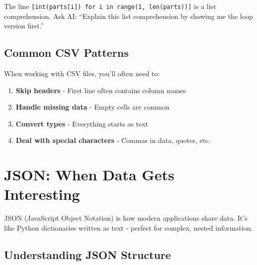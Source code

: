 \documentclass[
  letterpaper,
  DIV=11,
  numbers=noendperiod,
  oneside]{scrreprt}
\providecommand{\tightlist}{%
  \setlength{\itemsep}{0pt}\setlength{\parskip}{0pt}}\usepackage{longtable,booktabs,array}
\begin{document}
\begin{tcolorbox}[enhanced jigsaw, opacityback=0, colback=white, colframe=quarto-callout-warning-color-frame, breakable, titlerule=0mm, coltitle=black, rightrule=.15mm, colbacktitle=quarto-callout-warning-color!10!white, left=2mm, bottomtitle=1mm, bottomrule=.15mm, title=\textcolor{quarto-callout-warning-color}{\faExclamationTriangle}\hspace{0.5em}{Expression Explorer: List Comprehension}, opacitybacktitle=0.6, toptitle=1mm, leftrule=.75mm, arc=.35mm, toprule=.15mm]

The line
\texttt{{[}int(parts{[}i{]})\ for\ i\ in\ range(1,\ len(parts)){]}} is a
list comprehension. Ask AI: ``Explain this list comprehension by showing
me the loop version first.''

\end{tcolorbox}

\subsection{Common CSV Patterns}\label{common-csv-patterns}

When working with CSV files, you'll often need to:

\begin{enumerate}
\def\labelenumi{\arabic{enumi}.}
\tightlist
\item
  \textbf{Skip headers} - First line often contains column names
\item
  \textbf{Handle missing data} - Empty cells are common
\item
  \textbf{Convert types} - Everything starts as text
\item
  \textbf{Deal with special characters} - Commas in data, quotes, etc.
\end{enumerate}

\section{JSON: When Data Gets
Interesting}\label{json-when-data-gets-interesting}

JSON (JavaScript Object Notation) is how modern applications share data.
It's like Python dictionaries written as text - perfect for complex,
nested information.

\subsection{Understanding JSON
Structure}\label{understanding-json-structure}
\end{document}
